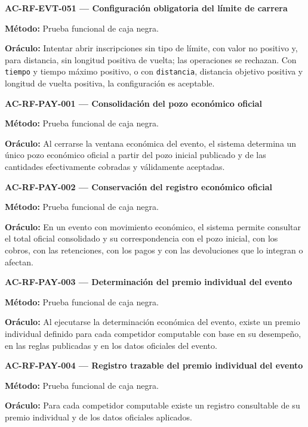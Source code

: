 \documentclass[10pt,letterpaper]{article}
\begin{document}
\noindent\textbf{AC-RF-EVT-051 --- Configuración obligatoria del límite de carrera}\par
\textbf{Método:} Prueba funcional de caja negra.\par
\textbf{Oráculo:} Intentar abrir inscripciones sin tipo de límite, con valor no positivo y, para distancia, sin longitud positiva de vuelta; las operaciones se rechazan. Con \texttt{tiempo} y tiempo máximo positivo, o con \texttt{distancia}, distancia objetivo positiva y longitud de vuelta positiva, la configuración es aceptable.\par\vspace{0.45em}
\noindent\textbf{AC-RF-PAY-001 --- Consolidación del pozo económico oficial}\par
\textbf{Método:} Prueba funcional de caja negra.\par
\textbf{Oráculo:} Al cerrarse la ventana económica del evento, el sistema determina un único pozo económico oficial a partir del pozo inicial publicado y de las cantidades efectivamente cobradas y válidamente aceptadas.\par\vspace{0.45em}
\noindent\textbf{AC-RF-PAY-002 --- Conservación del registro económico oficial}\par
\textbf{Método:} Prueba funcional de caja negra.\par
\textbf{Oráculo:} En un evento con movimiento económico, el sistema permite consultar el total oficial consolidado y su correspondencia con el pozo inicial, con los cobros, con las retenciones, con los pagos y con las devoluciones que lo integran o afectan.\par\vspace{0.45em}
\noindent\textbf{AC-RF-PAY-003 --- Determinación del premio individual del evento}\par
\textbf{Método:} Prueba funcional de caja negra.\par
\textbf{Oráculo:} Al ejecutarse la determinación económica del evento, existe un premio individual definido para cada competidor computable con base en su desempeño, en las reglas publicadas y en los datos oficiales del evento.\par\vspace{0.45em}
\noindent\textbf{AC-RF-PAY-004 --- Registro trazable del premio individual del evento}\par
\textbf{Método:} Prueba funcional de caja negra.\par
\textbf{Oráculo:} Para cada competidor computable existe un registro consultable de su premio individual y de los datos oficiales aplicados.\par\vspace{0.45em}
\end{document}
